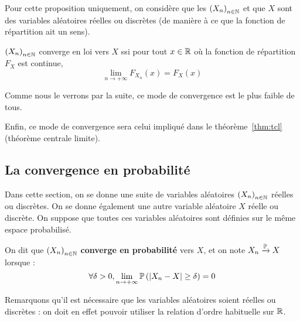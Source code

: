 \documentclass[../integ-proba.tex]{subfiles}
\begin{document}
    Pour cette proposition uniquement, on considère que les $\left(X_n\right)_{n\in\mathbb{N}}$ et que $X$ sont des variables aléatoires réelles ou discrètes (de manière à ce que la fonction de répartition ait un sens).

    \begin{prop}
        $\left(X_n\right)_{n\in\mathbb{N}}$ converge en loi vers $X$ ssi pour tout $x \in \mathbb{R}$ où la fonction de répartition $F_X$ est continue,
        \begin{displaymath}
            \lim_{n \to +\infty} F_{X_n}(x) = F_X(x)
        \end{displaymath}
    \end{prop}

    \begin{rem}
        Comme nous le verrons par la suite, ce mode de convergence est le plus faible de tous.
    \end{rem}

    \begin{rem}
        Enfin, ce mode de convergence sera celui impliqué dans le théorème~\ref{thm:tcl} (théorème centrale limite).
    \end{rem}

    \subsection{La convergence en probabilité}

    Dans cette section, on se donne une suite de variables aléatoires $\left(X_n\right)_{n\in\mathbb{N}}$ réelles ou discrètes.
    On se donne également une autre variable aléatoire $X$ réelle ou discrète.
    On suppose que toutes ces variables aléatoires sont définies sur le même espace probabilisé.

    \begin{defi}
        On dit que $\left(X_n\right)_{n\in\mathbb{N}}$ \textbf{converge en probabilité} vers $X$, et on note $X_n \xrightarrow[]{\mathbb{P}} X$ lorsque :
        \begin{displaymath}
            \forall \delta > 0, \lim_{n \to +\infty} \mathbb{P}\left(\left|X_n - X\right| \geq \delta\right) = 0
        \end{displaymath}
    \end{defi}

    \begin{rem}
        Remarquons qu'il est nécessaire que les variables aléatoires soient réelles ou discrètes : on doit en effet pouvoir utiliser la relation d'ordre habituelle sur $\mathbb{R}$.
    \end{rem}
\end{document}
